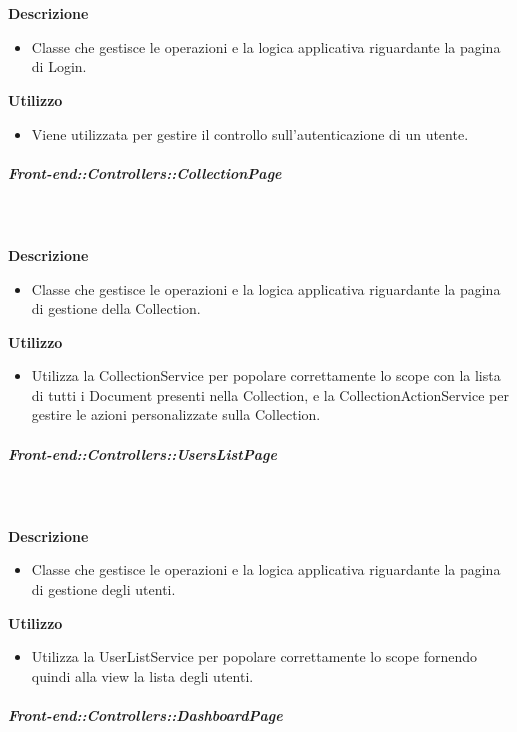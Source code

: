         \textbf{\\ \\ Descrizione} 
          \begin{itemize}
            \item[] Classe che gestisce le operazioni e la logica applicativa riguardante la pagina di Login.
          \end{itemize}      
        \textbf{Utilizzo}  
          \begin{itemize}
            \item[] Viene utilizzata per gestire il controllo sull'autenticazione di un utente.
          \end{itemize}
      \subparagraph{Front-end::Controllers::CollectionPage}
        
        \textbf{\\ \\ Descrizione} 
          \begin{itemize}
            \item[] Classe che gestisce le operazioni e la logica applicativa riguardante la pagina di gestione della Collection.
          \end{itemize}      
        \textbf{Utilizzo}  
          \begin{itemize}
            \item[] Utilizza la CollectionService per popolare correttamente lo scope con la lista di tutti i Document presenti nella Collection, e la CollectionActionService per gestire le azioni personalizzate sulla Collection.
          \end{itemize}
      \subparagraph{Front-end::Controllers::UsersListPage}
        
        \textbf{\\ \\ Descrizione} 
          \begin{itemize}
            \item[] Classe che gestisce le operazioni e la logica applicativa riguardante la pagina di gestione degli utenti.
          \end{itemize}      
        \textbf{Utilizzo}  
          \begin{itemize}
            \item[] Utilizza la UserListService per popolare correttamente lo scope fornendo quindi alla view la lista degli utenti.
          \end{itemize}
      \subparagraph{Front-end::Controllers::DashboardPage}
        
